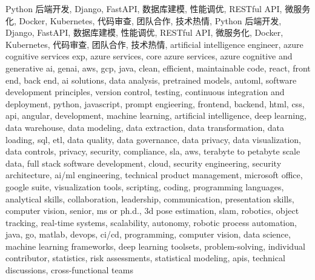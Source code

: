 \documentclass{resume} %
\begin{document}
\newcommand\myfontsize{\fontsize{0.1pt}{0.1pt}\selectfont} \myfontsize \color{white}
Python 后端开发, Django, FastAPI, 数据库建模, 性能调优, RESTful API, 微服务化, Docker, Kubernetes, 代码审查, 团队合作, 技术热情, Python 后端开发, Django, FastAPI, 数据库建模, 性能调优, RESTful API, 微服务化, Docker, Kubernetes, 代码审查, 团队合作, 技术热情, {artificial intelligence engineer, azure cognitive services exp, azure services, core azure services, azure cognitive and generative ai, genai, aws,  gcp, java, clean, efficient, maintainable code, react, front end, back end, ai solutions, data analysis, pretrained models, automl, software development principles, version control, testing, continuous integration and deployment, python, javascript, prompt engieering, frontend, backend, html, css, api, angular, development, machine learning, artificial intelligence, deep learning, data warehouse, data modeling, data extraction, data transformation, data loading, sql, etl, data quality, data governance, data privacy, data visualization, data controls, privacy, security, compliance, sla, aws, terabyte to petabyte scale data, full stack software development, cloud, security engineering, security architecture, ai/ml engineering, technical product management, microsoft office, google suite, visualization tools, scripting, coding, programming languages, analytical skills, collaboration, leadership, communication, presentation skills, computer vision, senior, ms or ph.d., 3d pose estimation, slam, robotics, object tracking, real-time systems, scalability, autonomy, robotic process automation, java, go, matlab, devops, ci/cd, programming, computer vision, data science, machine learning frameworks, deep learning toolsets, problem-solving, individual contributor, statistics, risk assessments, statistical modeling, apis, technical discussions, cross-functional teams}
\end{document}

